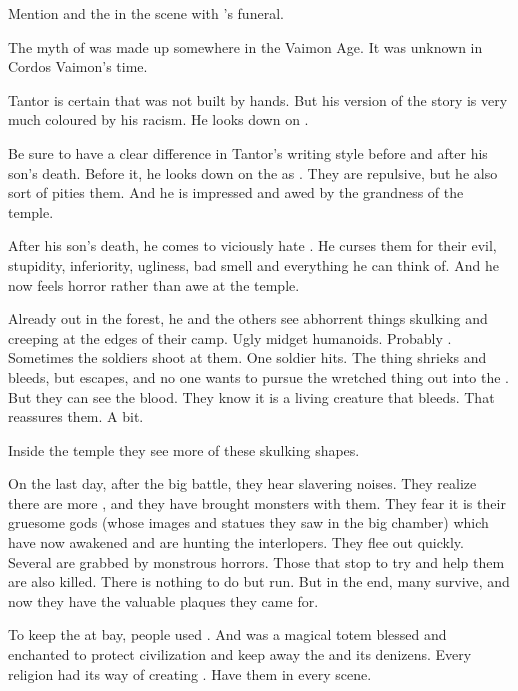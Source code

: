 Mention \Isphet and the \qliphoth in the scene with \Icor's funeral. 

The myth of \Isphet was made up somewhere in the Vaimon Age. It was unknown in Cordos Vaimon's time. 



Tantor is certain that \EreshKal was not built by \meccaran hands. 
But his version of the story is very much coloured by his racism. 
He looks down on \meccara. 

Be sure to have a clear difference in Tantor's writing style before and after his son's death. 
Before it, he looks down on the \meccara as . 
They are repulsive, but he also sort of pities them. 
And he is impressed and awed by the grandness of the temple. 

After his son's death, he comes to viciously hate \meccara. 
He curses them for their evil, stupidity, inferiority, ugliness, bad smell and everything he can think of. 
And he now feels horror rather than awe at the temple. 

Already out in the forest, he and the others see abhorrent things skulking and creeping at the edges of their camp. 
Ugly midget humanoids. 
Probably \meccara. 
Sometimes the soldiers shoot at them. 
One soldier hits. 
The thing shrieks and bleeds, but escapes, and no one wants to pursue the wretched thing out into the \wylde. 
But they can see the blood. 
They know it is a living creature that bleeds. 
That reassures them. 
A bit. 

Inside the temple they see more of these skulking shapes. 

On the last day, after the big battle, they hear slavering noises.
They realize there are more \meccara, and they have brought monsters with them. 
They fear it is their gruesome gods (whose images and statues they saw in the big chamber) which have now awakened and are hunting the interlopers. 
They flee out quickly.
Several are grabbed by monstrous horrors. 
Those that stop to try and help them are also killed. 
There is nothing to do but run. 
But in the end, many survive, and now they have the valuable plaques they came for. 



To keep the \wylde at bay, people used \eidola. 
And \eidolon was a magical totem blessed and enchanted to protect civilization and keep away the \wylde and its denizens. 
Every religion had its way of creating \eidola. 
Have them in every \wylde scene. 



